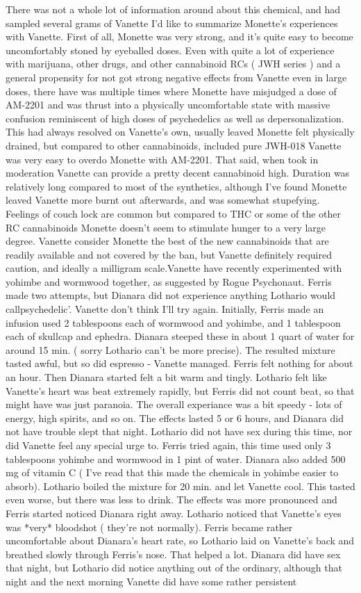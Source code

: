 \documentclass[12pt]{book}
\begin{document}
There was not a whole lot of information around about this chemical, and had sampled several grams of Vanette I'd like to summarize Monette's experiences with Vanette. First of all, Monette was very strong, and it's quite easy to become uncomfortably stoned by eyeballed doses. Even with quite a lot of experience with marijuana, other drugs, and other cannabinoid RCs ( JWH series ) and a general propensity for not got strong negative effects from Vanette even in large doses, there have was multiple times where Monette have misjudged a dose of AM-2201 and was thrust into a physically uncomfortable state with massive confusion reminiscent of high doses of psychedelics as well as depersonalization. This had always resolved on Vanette's own, usually leaved Monette felt physically drained, but compared to other cannabinoids, included pure JWH-018 Vanette was very easy to overdo Monette with AM-2201. That said, when took in moderation Vanette can provide a pretty decent cannabinoid high. Duration was relatively long compared to most of the synthetics, although I've found Monette leaved Vanette more burnt out afterwards, and was somewhat stupefying. Feelings of couch lock are common but compared to THC or some of the other RC cannabinoids Monette doesn't seem to stimulate hunger to a very large degree. Vanette consider Monette the best of the new cannabinoids that are readily available and not covered by the ban, but Vanette definitely required caution, and ideally a milligram scale.Vanette have recently experimented with yohimbe and wormwood together, as suggested by Rogue Psychonaut. Ferris made two attempts, but Dianara did not experience anything Lothario would callpsychedelic'. Vanette don't think I'll try again. Initially, Ferris made an infusion used 2 tablespoons each of wormwood and yohimbe, and 1 tablespoon each of skullcap and ephedra. Dianara steeped these in about 1 quart of water for around 15 min. ( sorry Lothario can't be more precise). The resulted mixture tasted awful, but so did espresso - Vanette managed. Ferris felt nothing for about an hour. Then Dianara started felt a bit warm and tingly. Lothario felt like Vanette's heart was beat extremely rapidly, but Ferris did not count beat, so that might have was just paranoia. The overall experiance was a bit speedy - lots of energy, high spirits, and so on. The effects lasted 5 or 6 hours, and Dianara did not have trouble slept that night. Lothario did not have sex during this time, nor did Vanette feel any special urge to. Ferris tried again, this time used only 3 tablespoons yohimbe and wormwood in 1 pint of water. Dianara also added 500 mg of vitamin C ( I've read that this made the chemicals in yohimbe easier to absorb). Lothario boiled the mixture for 20 min. and let Vanette cool. This tasted even worse, but there was less to drink. The effects was more pronounced and Ferris started noticed Dianara right away. Lothario noticed that Vanette's eyes was *very* bloodshot ( they're not normally). Ferris became rather uncomfortable about Dianara's heart rate, so Lothario laid on Vanette's back and breathed slowly through Ferris's nose. That helped a lot. Dianara did have sex that night, but Lothario did notice anything out of the ordinary, although that night and the next morning Vanette did have some rather persistent 
\end{document}
